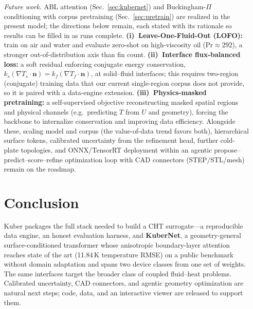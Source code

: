 \documentclass[conference]{IEEEtran}
\begin{document}
\textit{Future work.} ABL attention (Sec.~\ref{sec:kubernet}) and Buckingham-$\Pi$ conditioning with corpus
pretraining (Sec.~\ref{sec:pretrain}) are realized in the present model; the directions below remain, each
stated with its rationale so results can be filled in as runs complete. \textbf{(i)~Leave-One-Fluid-Out
(LOFO):} train on air and water and evaluate zero-shot on high-viscosity oil ($\mathrm{Pr}\approx292$), a
stronger out-of-distribution axis than fin count. \textbf{(ii)~Interface flux-balanced loss:} a soft residual
enforcing conjugate energy conservation, $k_s(\nabla T_s\!\cdot\!\mathbf{n})=k_f(\nabla T_f\!\cdot\!\mathbf{n})$,
at solid--fluid interfaces; this requires two-region (conjugate) training data that our current
single-region corpus does not provide, so it is paired with a data-engine extension.
\textbf{(iii)~Physics-masked pretraining:} a self-supervised objective reconstructing masked spatial regions
and physical channels (e.g.\ predicting $T$ from $U$ and geometry), forcing the backbone to internalize
conservation and improving data efficiency. Alongside these, scaling model and corpus (the value-of-data
trend favors both), hierarchical surface tokens, calibrated uncertainty from the refinement head, further
cold-plate topologies, and ONNX/TensorRT deployment within an agentic propose--predict--score--refine
optimization loop with CAD connectors (STEP/STL/mesh) remain on the roadmap.

\section{Conclusion}
Kuber packages the full stack needed to build a CHT surrogate---a reproducible data engine, an honest
evaluation harness, and \textbf{KuberNet}, a geometry-general surface-conditioned transformer whose
anisotropic boundary-layer attention reaches state of the art (11.84\,K temperature RMSE) on a public
benchmark without domain adaptation and spans two device classes from one set of weights. The same interfaces target the broader class of
coupled fluid--heat problems. Calibrated uncertainty, CAD connectors, and agentic geometry optimization
are natural next steps; code, data, and an interactive viewer are released to support them.
\end{document}

